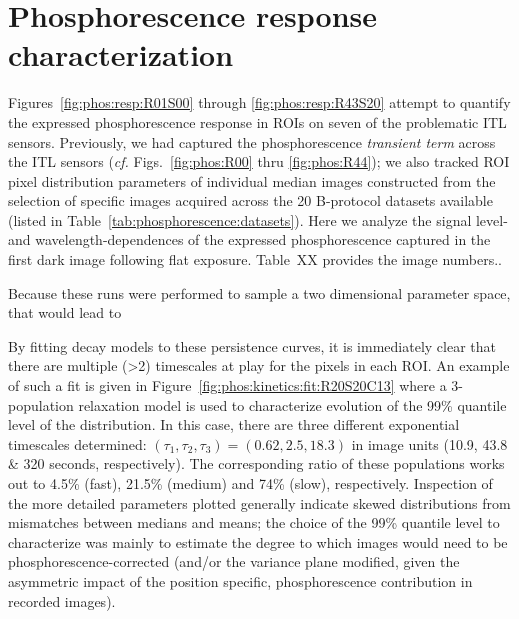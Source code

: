 \section{Phosphorescence response characterization}
\label{sect:response}
Figures~\ref{fig:phos:resp:R01S00} through \ref{fig:phos:resp:R43S20} attempt to quantify the expressed phosphorescence response in ROIs on seven of the problematic ITL sensors. Previously, we had captured the phosphorescence {\it transient term} across the ITL sensors ({\it cf.} Figs.~\ref{fig:phos:R00} thru \ref{fig:phos:R44}); we also tracked ROI pixel distribution parameters of individual median images constructed from the selection of specific images acquired across the 20 B-protocol datasets available (listed in Table~\ref{tab:phosphorescence:datasets}). Here we analyze the signal level- and wavelength-dependences of the expressed phosphorescence captured in the first dark image following flat exposure. Table~XX provides the image numbers.. 

Because these runs were performed to sample a two dimensional parameter space,  that would lead to 

By fitting decay models to these persistence curves, it is immediately clear that there are multiple (>2) timescales at play for the pixels in each ROI. An example of such a fit is given in Figure~\ref{fig:phos:kinetics:fit:R20S20C13} where a 3-population relaxation model is used to characterize evolution of the 99\% quantile level of the distribution. In this case, there are three different exponential timescales determined: $(\tau_1,\tau_2,\tau_3) = (0.62,2.5,18.3)$ in image units (10.9, 43.8 \& 320 seconds, respectively). The corresponding ratio of these populations works out to 4.5\% (fast), 21.5\% (medium) and 74\% (slow), respectively. Inspection of the more detailed parameters plotted generally indicate skewed distributions from mismatches between medians and means; the choice of the 99\% quantile level to characterize was mainly to estimate the degree to which images would need to be phosphorescence-corrected (and/or the variance plane modified, given the asymmetric impact of the position specific, phosphorescence contribution in recorded images). 


